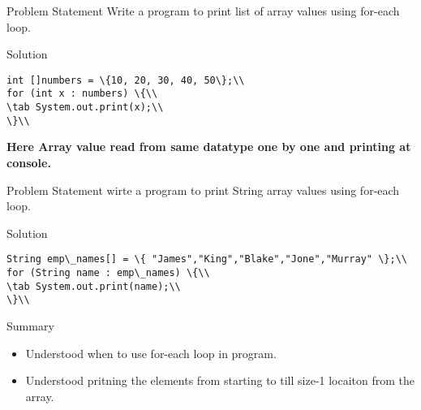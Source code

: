 \documentclass[aspectratio=169,14pt,usenames,dvipsnames]{beamer}
\newcommand\tab[1][1cm]{\hspace*{#1}}
\begin{document}
\begin{frame}{Problem Statement}
Write a program to print list of array values using for-each
loop.
\end{frame}

\begin{frame}{Solution}
\begin{center}
\begin{lstlisting}
int []numbers = \{10, 20, 30, 40, 50\};\\
for (int x : numbers) \{\\
\tab System.out.print(x);\\
\}\\
\end{lstlisting}
\end{center}
\vspace{0.8em}
\textbf{Here Array value read from same datatype one by one and
printing at console.}
\end{frame}

\begin{frame}{Problem Statement}
wirte a program to print String array values using for-each
loop.
\end{frame}


\begin{frame}{Solution}
\begin{lstlisting}
String emp\_names[] = \{ "James","King","Blake","Jone","Murray" \};\\
for (String name : emp\_names) \{\\
\tab System.out.print(name);\\
\}\\
\end{lstlisting}
\end{frame}


\begin{frame}{Summary}
\begin{itemize}
    \item Understood when to use for-each loop in program.
\item Understood pritning the elements from starting to till
size-1 locaiton from the array.
\end{itemize}
\end{frame}
\end{document}
